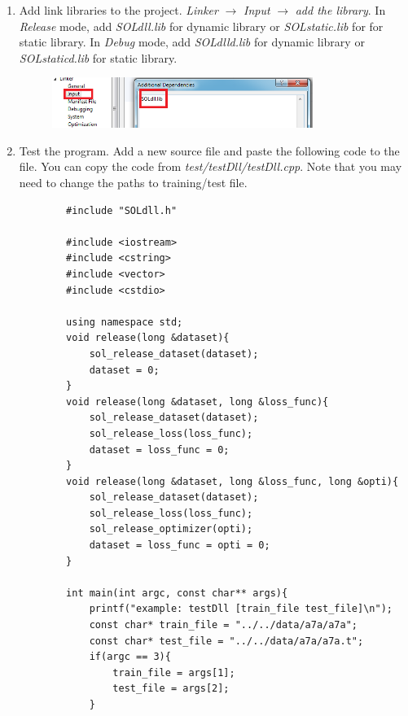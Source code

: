 \documentclass[11pt,a4paper]{article}
\newlength{\wideitemsep}
\let\olditem\item
\renewcommand{\item}{\setlength{\itemsep}{\wideitemsep}\olditem}
\begin{document}
\begin{enumerate}
    \item Add link libraries to the project. \emph{Linker} $\rightarrow$
        \emph{Input} $\rightarrow$ \emph{add the library}. In \emph{Release}
        mode, add \emph{SOLdll.lib} for dynamic library or \emph{SOLstatic.lib}
        for for static library. In \emph{Debug} mode, add \emph{SOLdlld.lib}
        for dynamic library or \emph{SOLstaticd.lib} for static library.
        \begin{figure}[!h]
            \centering
            \includegraphics[width=0.8\textwidth]{figs/test_sol_linker.png}
            \label{fig:test_sol_linker}
        \end{figure}
    \item Test the program. Add a new source file and paste the following code to
        the file. You can copy the code from \emph{test/testDll/testDll.cpp}.
        Note that you may need to change the paths to training/test file.
        \lstset{language=C++, 
            framexleftmargin=-1cm,
            xleftmargin=-1cm,
        }
        \begin{lstlisting}
        #include "SOLdll.h"

        #include <iostream>
        #include <cstring>
        #include <vector>
        #include <cstdio>

        using namespace std;
        void release(long &dataset){
            sol_release_dataset(dataset);
            dataset = 0;
        }
        void release(long &dataset, long &loss_func){
            sol_release_dataset(dataset);
            sol_release_loss(loss_func);
            dataset = loss_func = 0;
        }
        void release(long &dataset, long &loss_func, long &opti){
            sol_release_dataset(dataset);
            sol_release_loss(loss_func);
            sol_release_optimizer(opti);
            dataset = loss_func = opti = 0;
        }

        int main(int argc, const char** args){
            printf("example: testDll [train_file test_file]\n");
            const char* train_file = "../../data/a7a/a7a";
            const char* test_file = "../../data/a7a/a7a.t";
            if(argc == 3){
                train_file = args[1];
                test_file = args[2];
            }


\end{lstlisting}
\end{enumerate}
\end{document}
